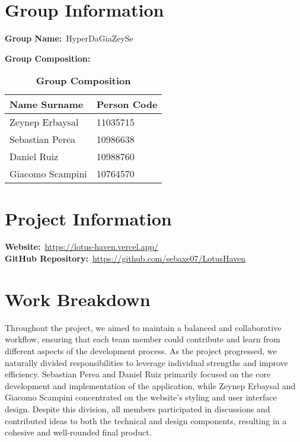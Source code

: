 
\section{Group Information}

\textbf{Group Name:}~HyperDaGiaZeySe

\textbf{Group Composition:}

\begin{table}[H]
    \centering
    \caption*{\textbf{Group Composition}}
    \begin{tabular}{|l|l|}
        \hline
        \rowcolor{bluepoli!20}
        \textbf{Name Surname} & \textbf{Person Code} \\
        \hline
        Zeynep Erbaysal & 11035715 \\
        Sebastian Perea & 10986638 \\
        Daniel Ruiz & 10988760 \\
        Giacomo Scampini & 10764570 \\
        \hline
    \end{tabular}
\end{table}

\section{Project Information}

\textbf{Website:}~\url{https://lotus-haven.vercel.app/}~\\
\textbf{GitHub Repository:}~\url{https://github.com/sebaxe07/LotusHaven}

\section{Work Breakdown}

Throughout the project, we aimed to maintain a balanced and collaborative workflow, ensuring that each team member could contribute and learn from different aspects of the development process. As the project progressed, we naturally divided responsibilities to leverage individual strengths and improve efficiency. Sebastian Perea and Daniel Ruiz primarily focused on the core development and implementation of the application, while Zeynep Erbaysal and Giacomo Scampini concentrated on the website’s styling and user interface design. Despite this division, all members participated in discussions and contributed ideas to both the technical and design components, resulting in a cohesive and well-rounded final product.
